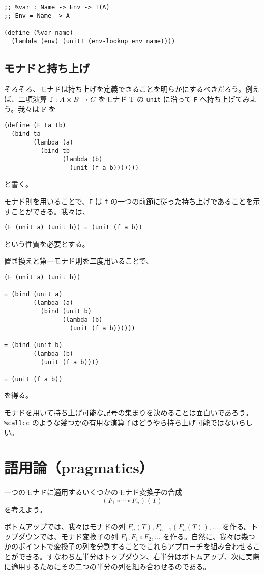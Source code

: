 \documentclass[11pt, oneside]{jsbook}   	%
\begin{document}
\begin{lstlisting}
;; %var : Name -> Env -> T(A)
;; Env = Name -> A

(define (%var name)
  (lambda (env) (unitT (env-lookup env name))))
\end{lstlisting}

\subsection{ モナドと持ち上げ }
そろそろ、モナドは持ち上げを定義できることを明らかにするべきだろう。例えば、二項演算 $\verb|f| : A \times B \rightarrow C$ をモナド T の \verb|unit| に沿って \verb|F| へ持ち上げてみよう。我々は F を
\begin{lstlisting}
(define (F ta tb)
  (bind ta
        (lambda (a)
          (bind tb
                (lambda (b)
                  (unit (f a b)))))))
\end{lstlisting}
と書く。

モナド則を用いることで、\verb|F| は \verb|f| の一つの前節に従った持ち上げであることを示すことができる。我々は、
\begin{lstlisting}
(F (unit a) (unit b)) = (unit (f a b))
\end{lstlisting}
という性質を必要とする。

置き換えと第一モナド則を二度用いることで、
\begin{lstlisting}
(F (unit a) (unit b))

= (bind (unit a)
        (lambda (a)
          (bind (unit b)
                (lambda (b)
                  (unit (f a b))))))

= (bind (unit b)
        (lambda (b)
          (unit (f a b))))

= (unit (f a b))
\end{lstlisting}
を得る。

モナドを用いて持ち上げ可能な記号の集まりを決めることは面白いであろう。\verb|%callcc| のような幾つかの有用な演算子はどうやら持ち上げ可能ではないらしい。

\section{ 語用論（pragmatics） }
一つのモナドに適用するいくつかのモナド変換子の合成
$$
(F_1 \circ \cdots \circ F_n)(T)
$$
を考えよう。

ボトムアップでは、我々はモナドの列 $F_n(T), F_{n-1}(F_n(T)), ....$ を作る。トップダウンでは、モナド変換子の列 $F_1, F_1\circ F_2 , ...$ を作る。自然に、我々は幾つかのポイントで変換子の列を分割することでこれらアプローチを組み合わせることができる。すなわち左半分はトップダウン、右半分はボトムアップ、次に実際に適用するためにその二つの半分の列を組み合わせるのである。
\end{document}
